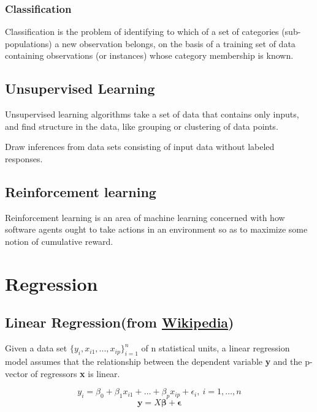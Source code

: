 \documentclass{article}
\begin{document}
\subsubsection{Classification}

Classification is the problem of identifying to which 
of a set of categories (sub-populations) a new observation 
belongs, on the basis of a training set of data containing 
observations (or instances) whose category membership is known.

\subsection{Unsupervised Learning}

Unsupervised learning algorithms take a set of data that 
contains only inputs, and find structure in the data, like 
grouping or clustering of data points.

\bigskip

\noindent Draw inferences from data sets consisting of input 
data without labeled responses.

\subsection{Reinforcement learning}
       
Reinforcement learning is an area of machine learning concerned 
with how software agents ought to take actions in an environment 
so as to maximize some notion of cumulative reward.

\section{Regression}

\subsection{Linear Regression(from \href{https://en.wikipedia.org/wiki/Linear_regression\#:~:text=In\%20statistics\%2C\%20linear\%20regression\%20is,is\%20called\%20simple\%20linear\%20regression.}{Wikipedia})}

Given a data set \(\{y_i, x_{i1}, ..., x_{ip}\}_{i=1}^n\) of n statistical units, a linear regression model assumes that the relationship between the dependent variable \textbf{y} and the p-vector of regressors \textbf{x} is linear.

\[y_i = \beta_0 + \beta_{1}x_{i1} + \dots + \beta_{p}x_{ip} + \epsilon_i, \: i = 1, \dots, n\]
\[\textbf{y} = X\boldsymbol{\beta} + \boldsymbol{\epsilon}\]
\end{document}
